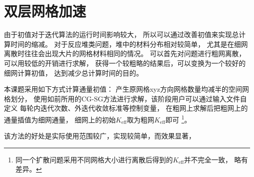 \section{双层网格加速}
\label{sec:equsolve.multimesh}

由于初值对于迭代算法的运行时间影响较大，
所以可以通过改善初值来实现总计算时间的缩减。
对于反应堆类问题，堆中的材料分布相对较简单，
尤其是在细网离散时往往会出现大片的网格材料相同的情况。
可以首先对问题进行粗网离散，可以用较低的开销进行求解，
获得一个较粗略的结果后，可以变换为一个较好的细网计算初值，
达到减少总计算时间的目的。

本课题采用如下方式计算通量初值：
产生原网格xyz方向网格数量均减半的空间网格划分，
使用如前所用的CG-SG方法进行求解，该阶段用户可以通过输入文件自定义
每轮内迭代次数、外迭代收敛标准等控制变量，
在粗网上求解后把粗网上的通量插值为细网通量，
细网上的初始$K_\mathrm{eff}$取为粗网$K_\mathrm{eff}$即可%
\footnote{同一个扩散问题采用不同网格大小进行离散后得到的$K_\mathrm{eff}$并不完全一致，
略有差异。}。

该方法的好处是实际使用范围较广，实现较简单，而效果显著，
